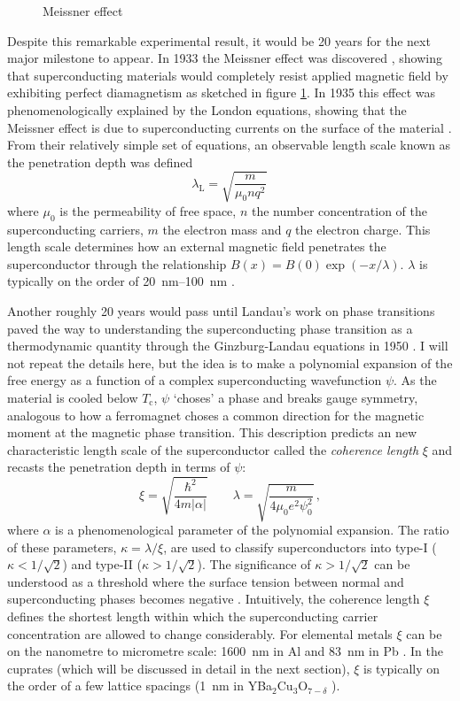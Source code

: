 \begin{figure}
    \centering
    \caption[Meissner effect]{Meissner effect}
    \label{fig:meissner}
\end{figure}

Despite this remarkable experimental result, it would be 20 years for the next major milestone to appear. In 1933 the Meissner effect was discovered \cite{Meissner1933}, showing that superconducting materials would completely resist applied magnetic field by exhibiting perfect diamagnetism as sketched in figure \ref{fig:meissner}. In 1935 this effect was phenomenologically explained by the London equations, showing that the Meissner effect is due to superconducting currents on the surface of the material \cite{London1935}. From their relatively simple set of equations, an observable length scale known as the penetration depth was defined
%
\[ \lambda_\text{L} = \sqrt{\frac{m}{\mu_0 n q^2}} \, \]
%
where $\mu_0$ is the permeability of free space, $n$ the number concentration of the superconducting carriers, $m$ the electron mass and $q$ the electron charge. This length scale determines how an external magnetic field penetrates the superconductor through the relationship $B(x) = B(0) \exp (-x / \lambda)$. $\lambda$ is typically on the order of \SIrange{20}{100}{\nano\meter} \cite{Kittel2005}.

Another roughly 20 years would pass until Landau's work on phase transitions paved the way to understanding the superconducting phase transition as a thermodynamic quantity through the Ginzburg-Landau equations in 1950 \cite{Ginzburg2009}. I will not repeat the details here, but the idea is to make a polynomial expansion of the free energy as a function of a complex superconducting wavefunction $\psi$. As the material is cooled below $T_\text{c}$, $\psi$ `choses' a phase and breaks gauge symmetry, analogous to how a ferromagnet choses a common direction for the magnetic moment at the magnetic phase transition. This description predicts an new characteristic length scale of the superconductor called the \emph{coherence length} $\xi$ and recasts the penetration depth in terms of $\psi$:
%
\[ \xi = \sqrt{\frac{\hbar^2}{4m|\alpha|}} \qquad \lambda = \sqrt{\frac{m}{4\mu_0 e^2 \psi_0^2 }} \, , \]
%
where $\alpha$ is a phenomenological parameter of the polynomial expansion. The ratio of these parameters, $\kappa = \lambda / \xi$, are used to classify superconductors into type-I ($\kappa < 1 / \sqrt{2}$) and type-II ($\kappa > 1 / \sqrt{2}$). The significance of $\kappa > 1 / \sqrt{2}$ can be understood as a threshold where the surface tension between normal and superconducting phases becomes negative \cite{Abrikosov1957}. Intuitively, the coherence length $\xi$ defines the shortest length within which the superconducting carrier concentration are allowed to change considerably. For elemental metals $\xi$ can be on the nanometre to micrometre scale: \SI{1600}{\nano\meter} in Al and \SI{83}{\nano\meter} in Pb \cite{Kittel2005}. In the cuprates (which will be discussed in detail in the next section), $\xi$ is typically on the order of a few lattice spacings (\SI{1}{\nano\meter} in YBa$_2$Cu$_3$O$_{7-\delta}$ \cite{Tomimoto1999}).

